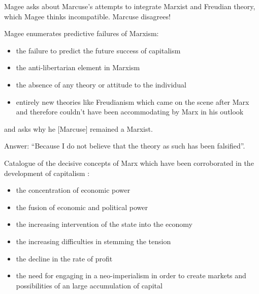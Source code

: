 \documentclass[10pt,titlepage]{book}
\begin{document}
Magee asks about Marcuse's attempts to integrate Marxist and Freudian theory, which Magee thinks incompatible.
Marcuse disagrees!

Magee enumerates predictive failures of Marxism:

\begin{itemize}
\item the failure to
  predict the future success of capitalism
  \item
the anti-libertarian element in Marxism
\item the absence of any theory or attitude to
  the individual
  \item  entirely new theories like
Freudianism which came on the scene
after Marx and therefore couldn't have
been accommodating by Marx in his
outlook
\end{itemize}

and asks why he [Marcuse] remained a Marxist.

Answer: ``Because I do not believe that the theory as such has been falsified''.

Catalogue of the decisive
concepts of Marx which have been
corroborated in the development of
capitalism :
\begin{itemize}
  \item the concentration of economic power
    \item the fusion of economic and      political power
      \item the increasing     intervention of the state into the economy
      \item the increasing difficulties in stemming the tension
      \item the decline in the rate of profit
      \item the need for engaging in a neo-imperialism in order to create markets and possibilities of an large accumulation of capital
\end {itemize}
\end{document}
